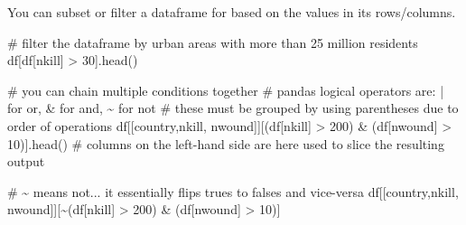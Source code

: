 \documentclass[
  letterpaper,
  DIV=11,
  numbers=noendperiod]{scrreprt}
\newenvironment{Shaded}{\begin{snugshade}}{\end{snugshade}}
\newcommand{\CommentTok}[1]{\textcolor[rgb]{0.37,0.37,0.37}{#1}}
\newcommand{\DecValTok}[1]{\textcolor[rgb]{0.68,0.00,0.00}{#1}}
\newcommand{\NormalTok}[1]{\textcolor[rgb]{0.00,0.23,0.31}{#1}}
\newcommand{\OperatorTok}[1]{\textcolor[rgb]{0.37,0.37,0.37}{#1}}
\newcommand{\StringTok}[1]{\textcolor[rgb]{0.13,0.47,0.30}{#1}}
\begin{document}
You can subset or filter a dataframe for based on the values in its
rows/columns.

\begin{Shaded}
\begin{Highlighting}[]
\CommentTok{\# filter the dataframe by urban areas with more than 25 million residents}
\NormalTok{df[df[}\StringTok{\textquotesingle{}nkill\textquotesingle{}}\NormalTok{] }\OperatorTok{\textgreater{}} \DecValTok{30}\NormalTok{].head()}
\end{Highlighting}
\end{Shaded}

\begin{Shaded}
\begin{Highlighting}[]
\CommentTok{\# you can chain multiple conditions together}
\CommentTok{\# pandas logical operators are: | for or, \& for and, \textasciitilde{} for not}
\CommentTok{\# these must be grouped by using parentheses due to order of operations}
\NormalTok{df[[}\StringTok{\textquotesingle{}country\textquotesingle{}}\NormalTok{,}\StringTok{\textquotesingle{}nkill\textquotesingle{}}\NormalTok{, }\StringTok{\textquotesingle{}nwound\textquotesingle{}}\NormalTok{]][(df[}\StringTok{\textquotesingle{}nkill\textquotesingle{}}\NormalTok{] }\OperatorTok{\textgreater{}} \DecValTok{200}\NormalTok{) }\OperatorTok{\&}\NormalTok{ (df[}\StringTok{\textquotesingle{}nwound\textquotesingle{}}\NormalTok{] }\OperatorTok{\textgreater{}} \DecValTok{10}\NormalTok{)].head()}
\CommentTok{\# columns on the left{-}hand side are here used to slice the resulting output}
\end{Highlighting}
\end{Shaded}

\begin{Shaded}
\begin{Highlighting}[]
\CommentTok{\# \textasciitilde{} means not... it essentially flips trues to falses and vice{-}versa}
\NormalTok{df[[}\StringTok{\textquotesingle{}country\textquotesingle{}}\NormalTok{,}\StringTok{\textquotesingle{}nkill\textquotesingle{}}\NormalTok{, }\StringTok{\textquotesingle{}nwound\textquotesingle{}}\NormalTok{]][}\OperatorTok{\textasciitilde{}}\NormalTok{(df[}\StringTok{\textquotesingle{}nkill\textquotesingle{}}\NormalTok{] }\OperatorTok{\textgreater{}} \DecValTok{200}\NormalTok{) }\OperatorTok{\&}\NormalTok{ (df[}\StringTok{\textquotesingle{}nwound\textquotesingle{}}\NormalTok{] }\OperatorTok{\textgreater{}} \DecValTok{10}\NormalTok{)]}
\end{Highlighting}
\end{Shaded}
\end{document}
